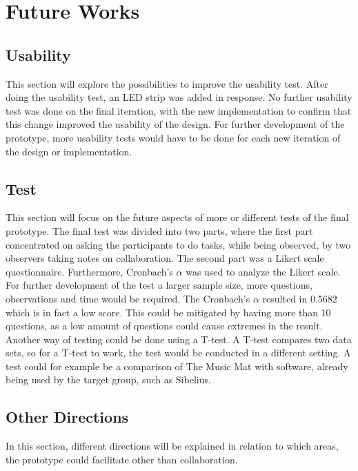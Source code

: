 \chapter{Future Works}

\section{Usability}
This section will explore the possibilities to improve the usability test. After doing the usability test, an LED strip was added in response. No further usability test was done on the final iteration, with the new implementation to confirm that this change improved the usability of the design. For further development of the prototype, more usability tests would have to be done for each new iteration of the design or implementation.

\section{Test}
This section will focus on the future aspects of more or different tests of the final prototype.
The final test was divided into two parts, where the first part concentrated on asking the participants to do tasks, while being observed, by two observers taking notes on collaboration. The second part was a Likert scale questionnaire. Furthermore, Cronbach's $\alpha$ was used to analyze the Likert scale. For further development of the test a larger sample size, more questions, observations and time would be required. The Cronbach's $\alpha$ resulted in 0.5682 which is in fact a low score. This could be mitigated by having more than 10 questions, as a low amount of questions could cause extremes in the result\cite{likertItems}.\\ 
Another way of testing could be done using a T-test. A T-test compares two data sets, so for a T-test to work, the test would be conducted in a different setting. A test could for example be a comparison of The Music Mat with software, already being used by the target group, such as Sibelius. 

\section{Other Directions}
In this section, different directions will be explained in relation to which areas, the prototype could facilitate other than collaboration.\\\\

